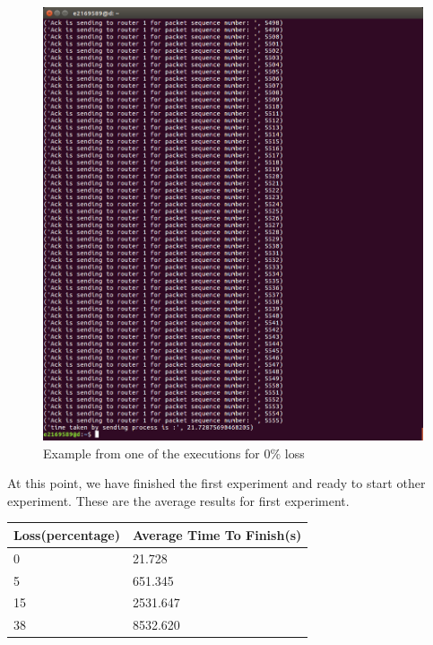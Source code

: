 \documentclass[conference]{IEEEtran}
\begin{document}
\begin{figure}[H]
    \centering
    \includegraphics[scale=0.13]{0loss.png}
    \caption{Example from one of the executions for $0\%$ loss }
\end{figure}

At this point, we have finished the first experiment and ready to start other experiment. These are the average results for first experiment.\\

\begin{table}[H]
\begin{tabular}{|l|l|}
\hline
Loss(percentage) & Average Time To Finish(s) \\ \hline
0                & 21.728                    \\ \hline
5                & 651.345                   \\ \hline
15               & 2531.647                  \\ \hline
38               & 8532.620                  \\ \hline
\end{tabular}
\end{table}
\end{document}
